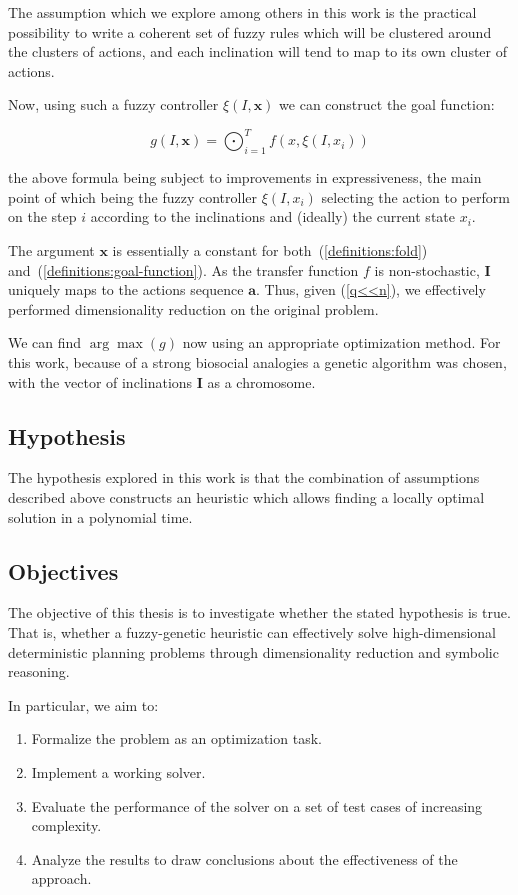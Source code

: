 \documentclass[11pt, a4paper]{article}
\begin{document}
	The assumption which we explore among others in this work is the practical possibility to write a coherent set of fuzzy rules which will be clustered around the clusters of actions, and each inclination will tend to map to its own cluster of actions.
	
	Now, using such a fuzzy controller $\xi(I, \mathbf{x})$ we can construct the goal function:
	
	\begin{equation}\label{definitions:goal-function}
		g(I, \mathbf{x}) = \bigodot_{i=1}^{T} f(x, \xi(I, x_i))
	\end{equation}
	
	the above formula being subject to improvements in expressiveness,
	the main point of which being the fuzzy controller $\xi(I, x_i)$ selecting the action to perform on the step $i$ according to the inclinations and (ideally) the current state $x_i$.
	
	The argument $\mathbf{x}$ is essentially a constant for both~(\ref{definitions:fold}) and~(\ref{definitions:goal-function}).
	As the transfer function $f$ is non-stochastic, $\mathbf{I}$ uniquely maps to the actions sequence $\mathbf{a}$.
	Thus, given (\ref{q<<n}), we effectively performed dimensionality reduction on the original problem.
		
	We can find $\arg \max(g)$ now using an appropriate optimization method.
	For this work, because of a strong biosocial analogies a genetic algorithm\cite{mitchell1999geneticalgorithms} was chosen,
	with the vector of inclinations $\mathbf{I}$ as a chromosome.
	
	\subsection{Hypothesis}
	The hypothesis explored in this work is that the combination of assumptions described above constructs an heuristic which allows finding a locally optimal solution in a polynomial time.
	
	\subsection{Objectives}
	The objective of this thesis is to investigate whether the stated hypothesis is true.
	That is, whether a fuzzy-genetic heuristic can effectively solve high-dimensional deterministic planning problems through dimensionality reduction and symbolic reasoning.
	
	In particular, we aim to:
	\begin{enumerate}
		\item Formalize the problem as an optimization task.
		\item Implement a working solver.
		\item Evaluate the performance of the solver on a set of test cases of increasing complexity.
		\item Analyze the results to draw conclusions about the effectiveness of the approach.
	\end{enumerate}
\end{document}
